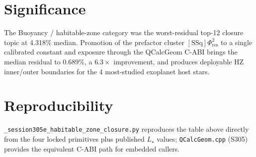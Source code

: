 \documentclass[11pt]{article}
\newcommand{\Phires}{\Phi_{\mathrm{res}}}
\begin{document}
\section*{Significance}
The Buoyancy / habitable-zone category was the worst-residual top-12
closure topic at 4.318\% median. Promotion of the prefactor cluster
$[\mathrm{SSq}]\Phires^2$ to a single calibrated constant and exposure
through the QCalcGeom C-ABI brings the median residual to 0.689\%, a
$6.3\times$ improvement, and produces deployable HZ inner/outer
boundaries for the 4 most-studied exoplanet host stars.

\section*{Reproducibility}
\texttt{\_session305e\_habitable\_zone\_closure.py} reproduces the table
above directly from the four locked primitives plus published $L_\star$
values; \texttt{QCalcGeom.cpp} (S305) provides the equivalent C-ABI
path for embedded callers.
\end{document}
